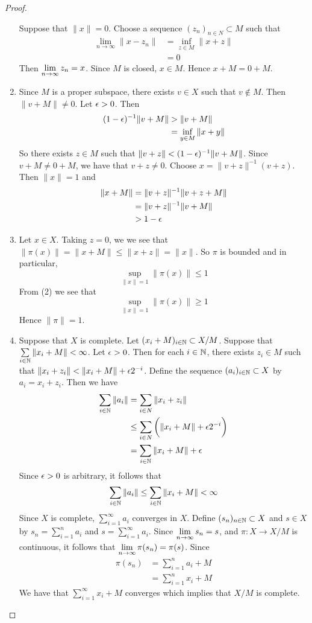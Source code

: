 \documentclass{book}
\begin{document}
\begin{proof}
\begin{enumerate}
			Suppose that $\|x \|=0$. Choose a sequence $(z_n)_{n \in N} \subset M$ such that 
			\begin{align*}
				\lim\limits_{n \rightarrow \infty} \|x - z_n \|
				& = \inf_{z \in M} \|x+ z \|\\
				& = 0
			\end{align*} 
			Then $\lim \limits_{n \rightarrow \infty} z_n =x$. Since $M$ is closed, $x \in M$. Hence $x+M=0+M$.
			\item Since $M$ is a proper subspace, there exists $v \in X$ such that $v \not \in M$. Then $\|v +M \|\neq 0$. Let $\epsilon >0$. Then 
			\begin{align*}
				(1-\epsilon)^{-1}\|v+M \|
				& > \|v+M \| \\
				& = \inf_{y \in M} \|x + y\|
			\end{align*}
			So there exists $z \in M$ such that $\|v+z \| < (1-\epsilon)^{-1} \|v+M \|$. Since $v+M \neq 0 + M$, we have that $v+z \neq 0$. Choose $x = \|v+z \|^{-1}(v+z)$. Then $\|x \|=1$ and 
			\begin{align*}
				\|x+M \|
				&= \|v+z \|^{-1} \|v+z +M \|\\
				&= \|v+z \|^{-1} \|v +M \|\\
				&> 1-\epsilon
			\end{align*}
			\item Let $x \in X$. Taking $z=0$, we we see that $\|\pi(x) \|=\|x+M \|\leq \|x+z \|= \|x \|$. So $\pi$ is bounded and in particular, $$\sup_{\|x \|=1} \|\pi(x) \|\leq 1$$ 
			From (2) we see that $$\sup_{\|x \|=1} \|\pi(x) \|\geq 1$$
			Hence $\|\pi\|= 1$. \vspace{.5cm}\\
			\item Suppose that $X$ is complete. Let $(x_i+M)_{i\in \mathbb{N}} \subset X/M$. Suppose that $\sum\limits_{i\in \mathbb{N}} \|x_i+M \|< \infty$. Let $\epsilon>0$. Then for each $i \in \mathbb{N}$, there exists $z_i \in M$ such that $\|x_i +z_i \|< \|x_i +M \|+ \epsilon2^{-i}$. Define the sequence $(a_i)_{i\in \mathbb{N}} \subset X$ by $a_i = x_i +z_i$. Then we have 
			\begin{align*}
				\sum_{i\in \mathbb{N}} \|a_i \|
				&= \sum_{i \in N} \|x_i + z_i \|\\
				&\leq \sum_{i \in N} \bigg (\|x_i +M \|+ \epsilon2^{-i} \bigg)\\
				&= \sum_{i\in \mathbb{N}} \|x_i+M\|+ \epsilon
			\end{align*}
			Since $\epsilon>0$ is arbitrary, it follows that $$\sum_{i\in \mathbb{N}} \|a_i \|\leq \sum_{i\in \mathbb{N}} \|x_i+M\|< \infty$$
			Since $X$ is complete, $\sum\limits_{i=1}^{\infty}a_i$ converges in $X$. Define $(s_n)_{n \in \mathbb{N}} \subset X$ and $s \in X$ by $s_n = \sum\limits_{i =1}^n a_i$ and $s = \sum\limits_{i=1}^\infty a_i $. Since $\lim \limits_{n \rightarrow \infty} s_n = s$, and $\pi: X \rightarrow X/M$ is continuous, it follows that $\lim \limits_{n \rightarrow \infty} \pi(s_n) = \pi(s)$. Since 
			\begin{align*}
				\pi(s_n) 
				&= \sum_{i=1}^n a_i +M\\
				&= \sum_{i=1}^n x_i +M
			\end{align*} 
			We have that $\sum\limits_{i=1}^{\infty}x_i +M$ converges which implies that $X/M$ is complete.
		\end{enumerate}
	\end{proof}
	
\end{document}
